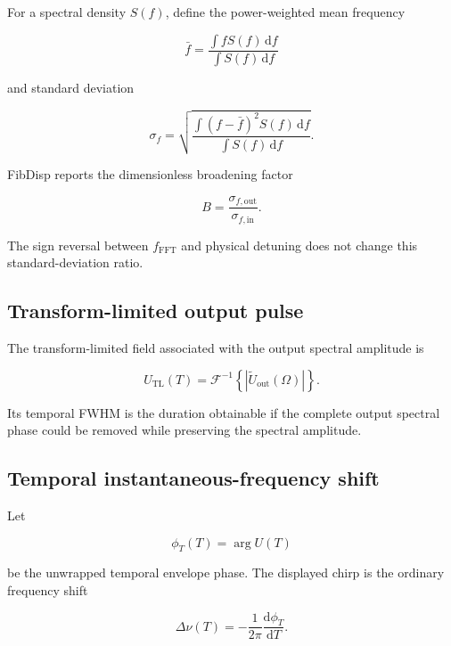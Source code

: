 \documentclass[11pt,a4paper]{article}
\newcommand{\FFT}{\mathrm{FFT}}
\newcommand{\TL}{\mathrm{TL}}
\newcommand{\dd}{\mathrm{d}}
\begin{document}
For a spectral density $S(f)$, define the power-weighted mean frequency

\begin{equation}
\bar f
=
\frac{\int fS(f)\,\dd f}{\int S(f)\,\dd f}
\end{equation}

and standard deviation

\begin{equation}
\sigma_f
=
\sqrt{
\frac{\int(f-\bar f)^2S(f)\,\dd f}{\int S(f)\,\dd f}
}.
\end{equation}

FibDisp reports the dimensionless broadening factor

\begin{equation}
\boxed{
B=\frac{\sigma_{f,\mathrm{out}}}{\sigma_{f,\mathrm{in}}}.
}
\end{equation}

The sign reversal between $f_{\FFT}$ and physical detuning does not change this
standard-deviation ratio.

\subsection{Transform-limited output pulse}

The transform-limited field associated with the output spectral amplitude is

\begin{equation}
\boxed{
U_{\TL}(T)
=\mathcal F^{-1}
\left\{
|\widetilde U_{\mathrm{out}}(\Omega)|
\right\}.
}
\end{equation}

Its temporal FWHM is the duration obtainable if the complete output spectral
phase could be removed while preserving the spectral amplitude.

\subsection{Temporal instantaneous-frequency shift}

Let

\begin{equation}
\phi_T(T)=\arg U(T)
\end{equation}

be the unwrapped temporal envelope phase. The displayed chirp is the ordinary
frequency shift

\begin{equation}
\boxed{
\Delta\nu(T)
=-\frac{1}{2\pi}
\frac{\dd\phi_T}{\dd T}.
}
\end{equation}
\end{document}
